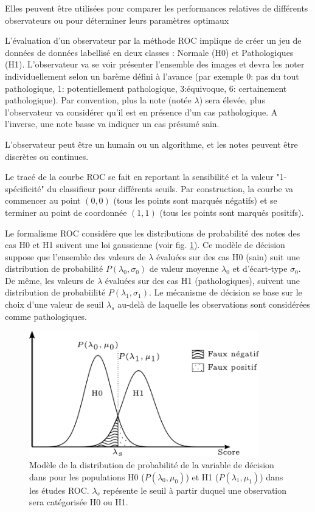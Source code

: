 Elles peuvent être utilisées pour comparer les performances relatives de différents observateurs ou pour déterminer leurs paramètres optimaux 

L’évaluation d'un observateur par la méthode ROC implique de créer un jeu de données de données labellisé en deux classes : Normale (H0) et Pathologiques (H1). L'observateur va se voir présenter l'ensemble des images et devra les noter individuellement selon un barème défini à l'avance (par exemple 0: pas du tout pathologique, 1: potentiellement pathologique, 3:équivoque, 6: certainement pathologique). Par convention, plus la note (notée $\lambda$) sera élevée, plus l'observateur va considérer qu'il est en présence d'un cas pathologique. A l'inverse, une note basse va indiquer un cas présumé sain.

L'observateur peut être un humain ou un algorithme, et les notes peuvent être discrètes ou continues.

Le tracé de la courbe ROC se fait en reportant la sensibilité et la valeur "1-spécificité" du classifieur pour différents seuils. Par construction, la courbe va commencer au point $(0,0)$ (tous les points sont marqués négatifs) et se terminer au point de coordonnée $(1,1)$ (tous les points sont marqués positifs).


Le formalisme ROC considère que les distributions de probabilité des notes des cas H0 et H1 suivent une loi gaussienne (voir fig. \ref{fig:loiROC}). Ce modèle de décision suppose que l'ensemble des valeurs de $\lambda$ évaluées sur des cas H0 (sain) suit une distribution de probabilité $P(\lambda_0, \sigma_0)$ de valeur moyenne $\lambda_0$ et d'écart-type $\sigma_0$. De même, les valeurs de $\lambda$ évaluées sur des cas H1 (pathologiques), suivent une distribution de probabiilité $P(\lambda_1, \sigma_1)$. Le mécanisme de décision se base sur le choix d'une valeur de seuil $\lambda_s$ au-delà de laquelle les observations sont considérées comme pathologiques.

\begin{figure}[h]
	
	\label{fig:loiROC}
	\begin{center}
	\includegraphics[width=10cm]{images/loiROC}
	\vspace{-0.5cm} %
	\end{center}
	\caption{Modèle de la distribution de probabilité de la variable de décision dans pour les populations H0 ($P(\lambda_0, \mu_0)$) et H1 ($P(\lambda_1, \mu_1)$) dans les études ROC. $\lambda_s$ repésente le seuil à partir duquel une observation sera catégorisée H0 ou H1.}
\end{figure}

